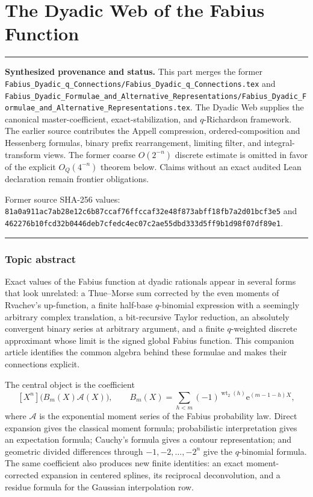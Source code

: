 \documentclass[11pt,oneside]{article}
\theoremstyle{definition}
\theoremstyle{remark}
\newcommand{\wt}{\operatorname{wt}_2}
\newcommand{\e}{\mathrm e}
\newenvironment{boxedremark}{%
  \par\smallskip\noindent\begin{center}\begin{minipage}{0.94\textwidth}%
  \color{black}\hrule\vspace{0.6em}\small
}{%
  \vspace{0.6em}\hrule\end{minipage}\end{center}\smallskip
}
\begin{document}
\part{The Dyadic Web of the Fabius Function}
\label{part:dyadicweb}
\begin{boxedremark}
\textbf{Synthesized provenance and status.} This part merges the former
\nolinkurl{Fabius_Dyadic_q_Connections/Fabius_Dyadic_q_Connections.tex} and
\nolinkurl{Fabius_Dyadic_Formulae_and_Alternative_Representations/Fabius_Dyadic_Formulae_and_Alternative_Representations.tex}.
The Dyadic Web supplies the canonical master-coefficient, exact-stabilization, and
$q$-Richardson framework.  The earlier source contributes the Appell compression,
ordered-composition and Hessenberg formulas, binary prefix rearrangement, limiting filter,
and integral-transform views.  The former coarse $O(2^{-n})$ discrete estimate is omitted
in favor of the explicit $O_Q(4^{-n})$ theorem below.  Claims without an exact audited Lean
declaration remain frontier obligations.\par\smallskip Former source SHA-256 values:
\nolinkurl{81a0a911ac7ab28e12c6b87ccaf76ffccaf32e48f873abff18fb7a2d01bcf3e5} and
\nolinkurl{462276b10fcd32b0446deb7cfedc4ec07c2ae55dbd333d5ff9b1d98f07df89e1}.
\end{boxedremark}
\section*{Topic abstract}
Exact values of the Fabius function at dyadic rationals appear in several forms that look
unrelated: a Thue--Morse sum corrected by the even moments of Rvachev's up-function, a finite
half-base $q$-binomial expression with a seemingly arbitrary complex translation, a
bit-recursive Taylor reduction, an absolutely convergent binary series at arbitrary argument,
and a finite $q$-weighted discrete approximant whose limit is the signed global Fabius
function.  This companion article identifies the common algebra behind these formulae and
makes their connections explicit.

The central object is the coefficient
\[
 [X^n]\bigl(B_m(X)\mathscr A(X)\bigr),
 \qquad
 B_m(X)=\sum_{h<m}(-1)^{\wt(h)}\e^{(m-1-h)X},
\]
where $\mathscr A$ is the exponential moment series of the Fabius probability law.  Direct
expansion gives the classical moment formula; probabilistic interpretation gives an
expectation formula; Cauchy's formula gives a contour representation; and geometric divided
differences through $-1,-2,\ldots,-2^n$ give the $q$-binomial formula.  The same coefficient
also produces new finite identities: an exact moment-corrected expansion in centered splines,
its reciprocal deconvolution, and a residue formula for the Gaussian interpolation row.
\end{document}
